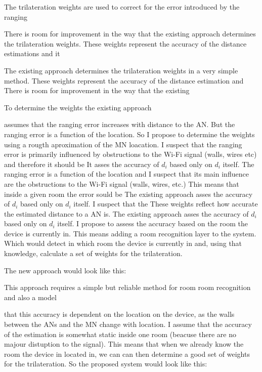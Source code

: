 The trilateration weights are used to correct for the error introduced by the ranging

There is room for improvement in the way that the existing approach determines the trilateration weights. These weights represent the accuracy of the distance estimations and it


The existing approach determines the trilateration weights in a very simple method. These weights represent the accuracy of the distance estimation and 
There is room for improvement in the way that the existing 


To determine the weights the existing approach 

assumes that the ranging error increases with distance to the AN. But the ranging error is a function of the location. So I propose to determine the weights using a rougth aproximation of the MN loacation.
I suspect that the ranging error is primarily influenced by obstructions to the Wi-Fi signal (walls, wires etc) and therefore it should be 
It asses the accuracy of \(d_i\) based only on \(d_i\) itself.
The ranging error is a function of the location and I suspect that its main influence are the obstructions to the Wi-Fi signal (walls, wires, etc.) This means that inside a given room the error sould be  
The existing approach asses the accuracy of \(d_i\) based only on \(d_i\) itself. I suspect that the 
 These weights reflect how accurate the estimated distance to a AN is. The existing approach asses the accuracy of \(d_i\) based only on \(d_i\) itself. I propose to assess the accuracy based on the room the device is currently in. This means adding a room recognition layer to the system. Which would detect in which room the device is currently in and, using that knowledge, calculate a set of weights for the trilateration.

\noindent The new approach would look like this:




This approach requires a simple but reliable method for room room recognition and also a model

that this accuracy is dependent on the location on the device, as the walls between the ANs and the MN change with location. I assume that the accuracy of the estimation is somewhat static inside one room (beacuse there are no majour distuption to the signal). This means that when we already know the room the device in located in, we can can then determine a good set of weights for the trilateration.
So the proposed system would look like this:

